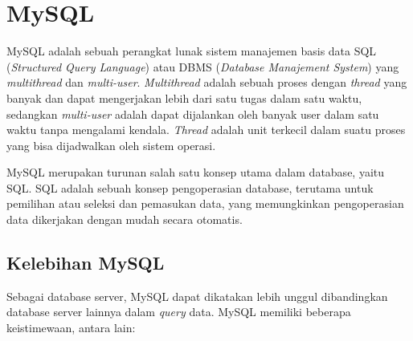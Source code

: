 


\section{MySQL}
\label{sec:sql}
MySQL adalah sebuah perangkat lunak sistem manajemen basis data SQL (\textit{Structured Query Language}) atau DBMS (\textit{Database Manajement System}) yang \textit{multithread} dan \textit{multi-user}. \textit{Multithread} adalah sebuah proses dengan \textit{thread} yang banyak dan dapat mengerjakan lebih dari satu tugas dalam satu waktu, sedangkan \textit{multi-user} adalah dapat dijalankan oleh banyak user dalam satu waktu tanpa mengalami kendala. \textit{Thread} adalah unit terkecil dalam suatu proses yang bisa dijadwalkan oleh sistem operasi.  

MySQL merupakan turunan salah satu konsep utama dalam database, yaitu SQL. SQL adalah sebuah konsep pengoperasian database, terutama untuk pemilihan atau seleksi dan pemasukan data, yang memungkinkan pengoperasian data dikerjakan dengan mudah secara otomatis.

\subsection{Kelebihan MySQL}
\label{sec:kelebihansql}

Sebagai database server, MySQL dapat dikatakan lebih unggul dibandingkan database server lainnya dalam \textit{query} data. MySQL memiliki beberapa keistimewaan, antara lain:
		
